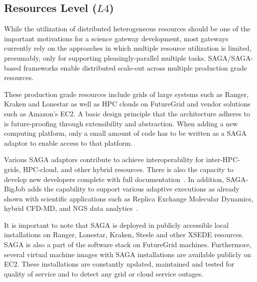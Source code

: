 \documentclass[]{svjour3}
\begin{document}

\subsection{Resources Level ($L4$)} 

While the utilization of distributed heterogeneous resources should be
one of the important motivations for a science gateway development,
most gateways currently rely on the approaches in which multiple
resource utilization is limited, presumably, only for supporting
pleasingly-parallel multiple tasks.  SAGA/SAGA-based frameworks enable
distributed scale-out across multiple production grade resources.

These production grade resources include grids of large systems such
as Ranger, Kraken and Lonestar as well as HPC clouds on FutureGrid and
vendor solutions such as Amazon's EC2. A basic design principle that
the architecture adheres to is future-proofing through extensibility
and abstraction. When adding a new computing platform, only a small
amount of code has to be written as a SAGA adaptor to enable access to
that platform.

Various SAGA adaptors contribute to achieve interoperability for
inter-HPC-grids, HPC-cloud, and other hybrid resources. There is also
the capacity to develop new developers complete with full
documentation~\cite{saga_url}.  In addition, SAGA-BigJob adds the
capability to support various adaptive executions as already shown
with scientific applications such as Replica Exchange Molecular
Dynamics, hybrid CFD-MD, and NGS data
analytics~\cite{saga-royalsoc,ko-efficient,dare-ecmls11}.

It is important to note that SAGA is deployed in publicly accessible
local installations on Ranger, Lonestar, Kraken, Steele and other
XSEDE resources. SAGA is also a part of the software stack on
FutureGrid machines. Furthermore, several virtual machine images with
SAGA installations are available publicly on EC2. These installations
are constantly updated, maintained and tested for quality of service
and to detect any grid or cloud service outages.
\end{document}
